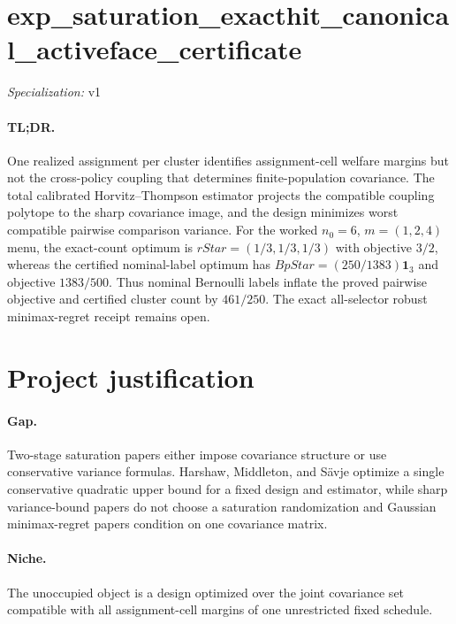 \documentclass{article}
\begin{document}
\sloppy

\section*{exp\_\allowbreak{}saturation\_\allowbreak{}exacthit\_\allowbreak{}canonical\_\allowbreak{}activeface\_\allowbreak{}certificate}

\noindent\textit{Specialization:} v1\par

\paragraph{TL;DR.} One realized assignment per cluster identifies assignment-cell welfare margins but not the cross-policy coupling that determines finite-population covariance. The total calibrated Horvitz--Thompson estimator projects the compatible coupling polytope to the sharp covariance image, and the design minimizes worst compatible pairwise comparison variance. For the worked \(n_0=6\), \(m=(1,2,4)\) menu, the exact-count optimum is \(rStar=(1/3,1/3,1/3)\) with objective \(3/2\), whereas the certified nominal-label optimum has \(BpStar=(250/1383)\mathbf1_3\) and objective \(1383/500\). Thus nominal Bernoulli labels inflate the proved pairwise objective and certified cluster count by \(461/250\). The exact all-selector robust minimax-regret receipt remains open.

\section{Project justification}

\paragraph{Gap.} Two-stage saturation papers either impose covariance structure or use conservative variance formulas. Harshaw, Middleton, and Sävje optimize a single conservative quadratic upper bound for a fixed design and estimator, while sharp variance-bound papers do not choose a saturation randomization and Gaussian minimax-regret papers condition on one covariance matrix.

\paragraph{Niche.} The unoccupied object is a design optimized over the joint covariance set compatible with all assignment-cell margins of one unrestricted fixed schedule.
\end{document}

